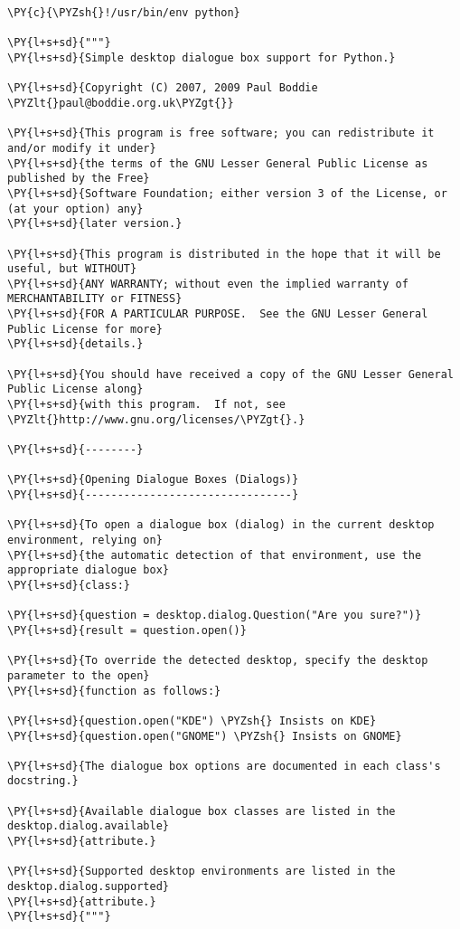 \begin{Verbatim}[commandchars=\\\{\}]
\PY{c}{\PYZsh{}!/usr/bin/env python}

\PY{l+s+sd}{"""}
\PY{l+s+sd}{Simple desktop dialogue box support for Python.}

\PY{l+s+sd}{Copyright (C) 2007, 2009 Paul Boddie \PYZlt{}paul@boddie.org.uk\PYZgt{}}

\PY{l+s+sd}{This program is free software; you can redistribute it and/or modify it under}
\PY{l+s+sd}{the terms of the GNU Lesser General Public License as published by the Free}
\PY{l+s+sd}{Software Foundation; either version 3 of the License, or (at your option) any}
\PY{l+s+sd}{later version.}

\PY{l+s+sd}{This program is distributed in the hope that it will be useful, but WITHOUT}
\PY{l+s+sd}{ANY WARRANTY; without even the implied warranty of MERCHANTABILITY or FITNESS}
\PY{l+s+sd}{FOR A PARTICULAR PURPOSE.  See the GNU Lesser General Public License for more}
\PY{l+s+sd}{details.}

\PY{l+s+sd}{You should have received a copy of the GNU Lesser General Public License along}
\PY{l+s+sd}{with this program.  If not, see \PYZlt{}http://www.gnu.org/licenses/\PYZgt{}.}

\PY{l+s+sd}{--------}

\PY{l+s+sd}{Opening Dialogue Boxes (Dialogs)}
\PY{l+s+sd}{--------------------------------}

\PY{l+s+sd}{To open a dialogue box (dialog) in the current desktop environment, relying on}
\PY{l+s+sd}{the automatic detection of that environment, use the appropriate dialogue box}
\PY{l+s+sd}{class:}

\PY{l+s+sd}{question = desktop.dialog.Question("Are you sure?")}
\PY{l+s+sd}{result = question.open()}

\PY{l+s+sd}{To override the detected desktop, specify the desktop parameter to the open}
\PY{l+s+sd}{function as follows:}

\PY{l+s+sd}{question.open("KDE") \PYZsh{} Insists on KDE}
\PY{l+s+sd}{question.open("GNOME") \PYZsh{} Insists on GNOME}

\PY{l+s+sd}{The dialogue box options are documented in each class's docstring.}

\PY{l+s+sd}{Available dialogue box classes are listed in the desktop.dialog.available}
\PY{l+s+sd}{attribute.}

\PY{l+s+sd}{Supported desktop environments are listed in the desktop.dialog.supported}
\PY{l+s+sd}{attribute.}
\PY{l+s+sd}{"""}


\end{Verbatim}
